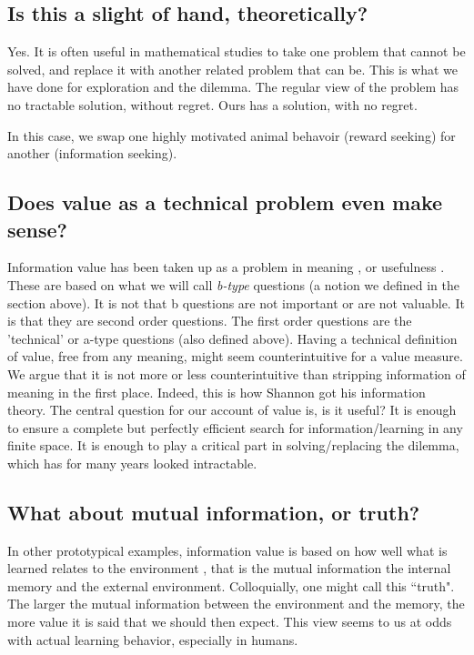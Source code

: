 \subsection*{Is this a slight of hand, theoretically?}
Yes. It is often useful in mathematical studies to take one problem that cannot be solved, and replace it with another related problem that can be. This is what we have done for exploration and the dilemma. The regular view of the problem has no tractable solution, without regret. Ours has a solution, with no regret.

In this case, we swap one highly motivated animal behavoir (reward seeking) for another (information seeking).


\subsection*{Does value as a technical problem even make sense?}
Information value has been taken up as a problem in meaning  \citep{Kolchinsky2018}, or usefulness \citep{Tishby2000}. These are based on what we will call \textit{b-type} questions (a notion we defined in the section above). It is not that b questions are not important or are not valuable. It is that they are second order questions. The first order questions are the 'technical' or a-type questions (also defined above). 
Having a technical definition of value, free from any meaning, might seem counterintuitive for a value measure. We argue that it is not more or less counterintuitive than stripping information of meaning in the first  place. Indeed, this is how Shannon got his information theory. The central question for our account of value is, is it useful? It is enough to ensure a complete but perfectly efficient search for information/learning in any finite space. It is enough to play a critical part in solving/replacing the dilemma, which has for many years looked intractable. 


\subsection*{What about mutual information, or truth?}
In other prototypical examples, information value is based on how well what is learned relates to the environment \citep{Behrens2007,Kolchinsky2018,Tishby2000}, that is the mutual information the internal memory and the external environment. Colloquially, one might call this ``truth". The larger the mutual information between the environment and the memory, the more value it is said that we should then expect. This view seems to us at odds with actual learning behavior, especially in humans. 

